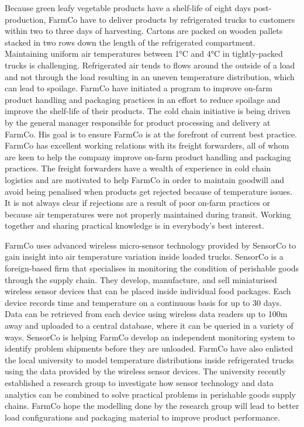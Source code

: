 Because green leafy vegetable products have a shelf-life of eight days post-production, FarmCo have to deliver products by refrigerated trucks to customers within two to three days of harvesting. Cartons are packed on wooden pallets stacked in two rows down the length of the refrigerated compartment. Maintaining uniform air temperatures between 1\si{\degree}C and 4\si{\degree}C in tightly-packed trucks is challenging. Refrigerated air tends to flows around the outside of a load and not through the load resulting in an uneven temperature distribution, which can lead to spoilage. FarmCo have initiated a program to improve on-farm product handling and packaging practices in an effort to reduce spoilage and improve the shelf-life of their products. The cold chain initiative is being driven by the general manager responsible for product processing and delivery at FarmCo. His goal is to ensure FarmCo is at the forefront of current best practice. FarmCo has excellent working relations with its freight forwarders, all of whom are keen to help the company improve on-farm product handling and packaging practices. The freight forwarders have a wealth of experience in cold chain logistics and are motivated to help FarmCo in order to maintain goodwill and avoid being penalised when products get rejected because of temperature issues. It is not always clear if rejections are a result of poor on-farm practices or because air temperatures were not properly maintained during transit. Working together and sharing practical knowledge is in everybody's best interest.\medskip

FarmCo uses advanced wireless micro-sensor technology provided by SensorCo to gain insight into air temperature variation inside loaded trucks. SensorCo is a foreign-based firm that specialises in monitoring the condition of perishable goods through the supply chain. They develop, manufacture, and sell miniaturised wireless sensor devices that can be placed inside individual food packages. Each device records time and temperature on a continuous basis for up to 30 days. Data can be retrieved from each device using wireless data readers up to 100m away and uploaded to a central database, where it can be queried in a variety of ways. SensorCo is helping FarmCo develop an independent monitoring system to identify problem shipments before they are unloaded. FarmCo have also enlisted the local university to model temperature distributions inside refrigerated trucks using the data provided by the wireless sensor devices. The university recently established a research group to investigate how sensor technology and data analytics can be combined to solve practical problems in perishable goods supply chains. FarmCo hope the modelling done by the research group will lead to better load configurations and packaging material to improve product performance.\medskip

